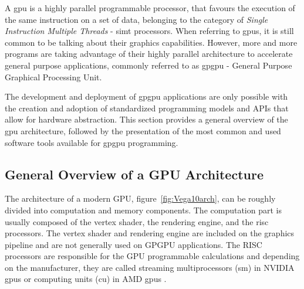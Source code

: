 A \acrshort{gpu} is a highly parallel programmable processor, that favours the execution of the same instruction on a set of data, belonging to the category of \textit{Single Instruction Multiple Threads} - \acrshort{simt} processors. When referring to \acrshort{gpu}s, it is still common to be talking about their graphics capabilities. However, more and more programs are taking advantage of their highly parallel architecture to accelerate general purpose applications, commonly referred to as \acrshort{gpgpu} - General Purpose Graphical Processing Unit.

The development and deployment of \acrshort{gpgpu} applications are only possible with the creation and adoption of standardized programming models and APIs that allow for hardware abstraction. This section provides a general overview of the \acrshort{gpu} architecture, followed by the presentation of the most common and used software tools available for \acrshort{gpgpu} programming.




\subsection{General Overview of a GPU Architecture}
The architecture of a modern GPU, figure~\ref{fig:Vega10arch}, can be roughly divided into computation and memory components. The computation part is usually composed of the vertex shader, the rendering engine, and the \acrshort{risc} processors. The vertex shader and rendering engine are included on the graphics pipeline and are not generally used on GPGPU applications. The RISC processors are responsible for the GPU programmable calculations and depending on the manufacturer, they are called streaming multiprocessors (\acrshort{sm}) in NVIDIA \acrshort{gpu}s \cite{nvidia_cuda_2008} or computing units (\acrshort{cu}) in AMD \acrshort{gpu}s \cite{amd_amd_2008}.  


